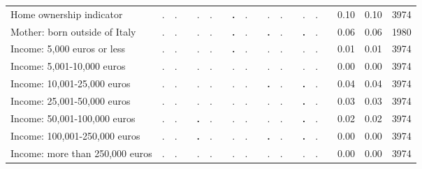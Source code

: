 \begin{tabular}{l c c c c c c c c c c c c c c c c c c}
Home ownership indicator &         . &         . & &         . &         . & & \textbf{        .} &         . & &         . &         . & &         . &         . & &      0.10 &      0.10 &      3974 \\
Mother: born outside of Italy &         . &         . & &         . &         . & & \textbf{        .} &         . & & \textbf{        .} &         . & & \textbf{        .} &         . & &      0.06 &      0.06 &      1980 \\
Income: 5,000 euros or less &         . &         . & &         . &         . & & \textbf{        .} &         . & &         . &         . & &         . &         . & &      0.01 &      0.01 &      3974 \\
Income: 5,001-10,000 euros &         . &         . & &         . &         . & &         . &         . & &         . &         . & &         . &         . & &      0.00 &      0.00 &      3974 \\
Income: 10,001-25,000 euros &         . &         . & &         . &         . & &         . &         . & & \textbf{        .} &         . & & \textbf{        .} &         . & &      0.04 &      0.04 &      3974 \\
Income: 25,001-50,000 euros &         . &         . & &         . &         . & &         . &         . & &         . &         . & & \textbf{        .} &         . & &      0.03 &      0.03 &      3974 \\
Income: 50,001-100,000 euros &         . &         . & & \textbf{        .} &         . & &         . &         . & &         . &         . & & \textbf{        .} &         . & &      0.02 &      0.02 &      3974 \\
Income: 100,001-250,000 euros &         . &         . & & \textbf{        .} &         . & &         . &         . & & \textbf{        .} &         . & & \textbf{        .} &         . & &      0.00 &      0.00 &      3974 \\
Income: more than 250,000 euros &         . &         . & &         . &         . & &         . &         . & &         . &         . & &         . &         . & &      0.00 &      0.00 &      3974 \\
\bottomrule
\end{tabular}
